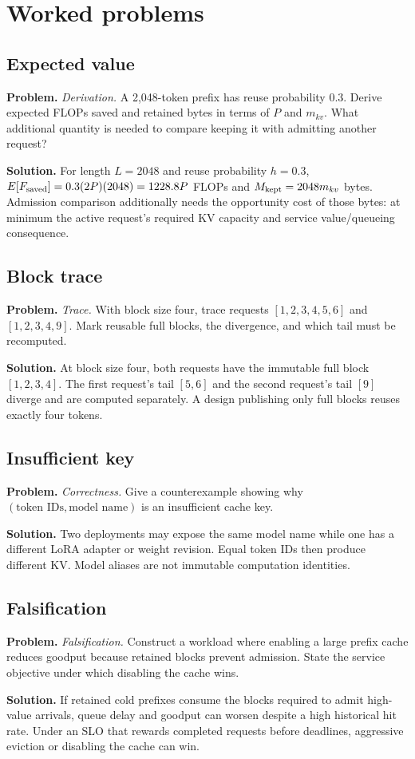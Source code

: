 \section{Worked problems}

\subsection{Expected value}
\textbf{Problem.} \emph{Derivation.} A 2,048-token prefix has reuse probability 0.3. Derive
expected FLOPs saved and retained bytes in terms of $P$ and $m_{kv}$. What additional
quantity is needed to compare keeping it with admitting another request?

\textbf{Solution.} For length $L=2048$ and reuse probability $h=0.3$,
$E[F_{\rm saved}]=0.3(2P)(2048)=1228.8P$ FLOPs and
$M_{\rm kept}=2048m_{kv}$ bytes. Admission comparison additionally needs the
opportunity cost of those bytes: at minimum the active request's required KV capacity
and service value/queueing consequence.

\subsection{Block trace}
\textbf{Problem.} \emph{Trace.} With block size four, trace requests
$[1,2,3,4,5,6]$ and $[1,2,3,4,9]$. Mark reusable full blocks, the divergence, and
which tail must be recomputed.

\textbf{Solution.} At block size four, both requests have the immutable full block $[1,2,3,4]$.
The first request's tail $[5,6]$ and the second request's tail $[9]$ diverge and are
computed separately. A design publishing only full blocks reuses exactly four tokens.

\subsection{Insufficient key}
\textbf{Problem.} \emph{Correctness.} Give a counterexample showing why
$(\text{token IDs},\text{model name})$ is an insufficient cache key.

\textbf{Solution.} Two deployments may expose the same model name while one has a different LoRA adapter
or weight revision. Equal token IDs then produce different KV. Model aliases are not
immutable computation identities.

\subsection{Falsification}
\textbf{Problem.} \emph{Falsification.} Construct a workload where enabling a large prefix cache
reduces goodput because retained blocks prevent admission. State the service objective
under which disabling the cache wins.

\textbf{Solution.} If retained cold prefixes consume the blocks required to admit high-value arrivals,
queue delay and goodput can worsen despite a high historical hit rate. Under an SLO
that rewards completed requests before deadlines, aggressive eviction or disabling
the cache can win.
